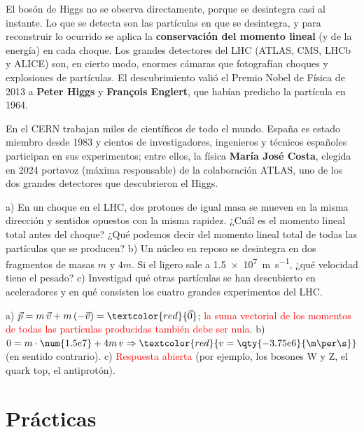 El bosón de Higgs no se observa directamente, porque se desintegra casi al instante. Lo que se detecta son las partículas en que se
desintegra, y para reconstruir lo ocurrido se aplica la \textbf{conservación del momento lineal} (y de la energía) en cada choque. Los
grandes detectores del LHC (ATLAS, CMS, LHCb y ALICE) son, en cierto modo, enormes cámaras que fotografían choques y explosiones de
partículas. El descubrimiento valió el Premio Nobel de Física de 2013 a \textbf{Peter Higgs} y \textbf{François Englert}, que habían
predicho la partícula en 1964.

En el CERN trabajan miles de científicos de todo el mundo. España es estado miembro desde 1983 y cientos de investigadores, ingenieros
y técnicos españoles participan en sus experimentos; entre ellos, la física \textbf{María José Costa}, elegida en 2024 portavoz (máxima
responsable) de la colaboración ATLAS, uno de los dos grandes detectores que descubrieron el Higgs.

\begin{exercise}
    a) En un choque en el LHC, dos protones de igual masa se mueven en la misma dirección y sentidos opuestos con la misma rapidez.
    ¿Cuál es el momento lineal total antes del choque? ¿Qué podemos decir del momento lineal total de todas las partículas que se
    producen? b) Un núcleo en reposo se desintegra en dos fragmentos de masas \(m\) y \(4m\). Si el ligero sale a
    \qty{1.5e7}{\m\per\s}, ¿qué velocidad tiene el pesado? c) Investigad qué otras partículas se han descubierto en aceleradores y
    en qué consisten los cuatro grandes experimentos del LHC.
    \begin{solu}
        a) \(\vec{p} = m\,\vec{v} + m\,(-\vec{v}) = \textcolor{red}{\vec{0}}\); \textcolor{red}{la suma vectorial de los momentos de
        todas las partículas producidas también debe ser nula}. b) \(0 = m \cdot \num{1.5e7} + 4m\,v \Rightarrow
        \textcolor{red}{v = \qty{-3.75e6}{\m\per\s}}\) (en sentido contrario). c) \textcolor{red}{Respuesta abierta} (por ejemplo,
        los bosones W y Z, el quark top, el antiprotón).
    \end{solu}
\end{exercise}

\section{Prácticas}\label{sec:ud10-practicas}

